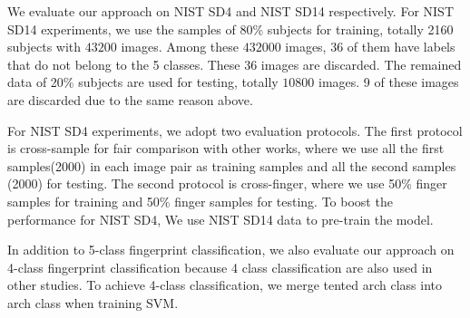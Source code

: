 We evaluate our approach on NIST SD4 and NIST SD14 respectively.
%
For NIST SD14 experiments, we use the samples of 80\% subjects for training, totally 2160 subjects with $43200$ images. Among these $432000$ images, 36 of them have labels that do not belong to the 5 classes. These 36 images are discarded. 
The remained data of 20\% subjects are used for testing, totally $10800$ images. 9 of these images are discarded due to the same reason above.
%

For NIST SD4 experiments,  we adopt two evaluation protocols. The first protocol is cross-sample for fair comparison with other works, where we use all the first samples(2000) in each image pair as training samples and all the second samples (2000) for testing. The second protocol is cross-finger, where we use 50\% finger samples for training and 50\% finger samples for testing. To boost the performance for NIST SD4, We use NIST SD14 data to pre-train the model.

%


In addition to 5-class fingerprint classification, we also evaluate our approach on 4-class fingerprint classification because 4 class classification are also used in other studies. 
%
To achieve 4-class classification, we merge tented arch class into arch class when training SVM.

